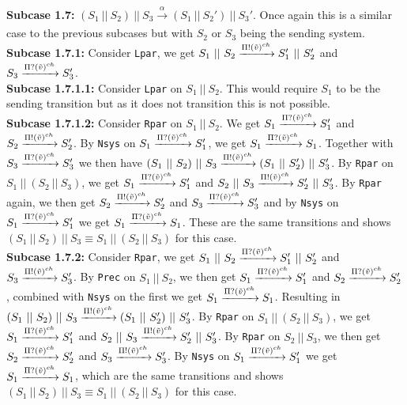 \indent \textbf{Subcase 1.7: }$(S_1 \ || \ S_2)\ ||\ S_3 \xrightarrow[]{\alpha} (S_1 \ || \ S_2')\ ||\ S_3'$. Once again this is a similar case to the previous subcases but with $S_2$ or $S_3$ being the sending system.\\
\indent \indent \textbf{Subcase 1.7.1: } Consider \texttt{Lpar}, we get $S_1 \ || \ S_2 \xrightarrow[]{\Pi ! (\Tilde{v})^{ch}} S_1' \ || \ S_2'$ and $S_3 \xrightarrow[]{\Pi ? (\Tilde{v})^{ch}} S_3'$.\\
\indent \indent \indent \textbf{Subcase 1.7.1.1: } Consider \texttt{Lpar} on $S_1\ ||\ S_2$. This would require $S_1$ to be the sending transition but as it does not transition this is not possible.\\ 
\indent \indent \indent \textbf{Subcase 1.7.1.2: }Consider \texttt{Rpar} on $S_1\ ||\ S_2$. We get $S_1 \xrightarrow[]{\Pi ? (\Tilde{v})^{ch}} S_1'$ and $S_2 \xrightarrow[]{\Pi ! (\Tilde{v})^{ch}} S_2'$. By \texttt{Nsys} on $S_1 \xrightarrow[]{\Pi ? (\Tilde{v})^{ch}} S_1'$, we get $S_1 \xrightarrow[]{\Pi ? (\Tilde{v})^{ch}} S_1$. Together with $S_3 \xrightarrow[]{\Pi ? (\Tilde{v})^{ch}} S_3'$ we then have $(S_1 \ || \ S_2)\ ||\ S_3 \xrightarrow[]{\Pi ! (\Tilde{v})^{ch}} (S_1 \ || \ S_2')\ ||\ S_3'$. By \texttt{Rpar} on $S_1 \ ||\ (S_2 \ || \ S_3)$, we get $S_1 \xrightarrow[]{\Pi ? (\Tilde{v})^{ch}} S_1'$ and $S_2 \ || \ S_3 \xrightarrow[]{\Pi ! (\Tilde{v})^{ch}} S_2' \ || \ S_3'$. By \texttt{Rpar} again, we then get $S_2 \xrightarrow[]{\Pi ! (\Tilde{v})^{ch}} S_2'$ and $S_3 \xrightarrow[]{\Pi ? (\Tilde{v})^{ch}} S_3'$ and by \texttt{Nsys} on $S_1 \xrightarrow[]{\Pi ? (\Tilde{v})^{ch}} S_1'$ we get $S_1 \xrightarrow[]{\Pi ? (\Tilde{v})^{ch}} S_1$. These are the same transitions and shows $(S_1 \ ||\ S_2 )\ || \ S_3 \equiv S_1 \ ||\ (S_2 \ || \ S_3)$ for this case.\\
\indent \indent \textbf{Subcase 1.7.2: }  Consider \texttt{Rpar}, we get $S_1 \ || \ S_2 \xrightarrow[]{\Pi ? (\Tilde{v})^{ch}} S_1' \ || \ S_2'$ and $S_3 \xrightarrow[]{\Pi ! (\Tilde{v})^{ch}} S_3'$. By \texttt{Prec} on $S_1\ ||\ S_2$, we then get $S_1 \xrightarrow[]{\Pi ? (\Tilde{v})^{ch}} S_1'$ and $S_2 \xrightarrow[]{\Pi ? (\Tilde{v})^{ch}} S_2'$, combined with \texttt{Nsys} on the first we get $S_1 \xrightarrow[]{\Pi ? (\Tilde{v})^{ch}} S_1$. Resulting in $(S_1 \ || \ S_2)\ ||\ S_3 \xrightarrow[]{\Pi ! (\Tilde{v})^{ch}} (S_1 \ || \ S_2')\ ||\ S_3'$. By \texttt{Rpar} on $S_1 \ ||\ (S_2 \ || \ S_3)$, we get $S_1 \xrightarrow[]{\Pi ? (\Tilde{v})^{ch}} S_1'$ and $S_2 \ || \ S_3 \xrightarrow[]{\Pi ! (\Tilde{v})^{ch}} S_2' \ || \ S_3'$. By \texttt{Rpar} on $S_2\ ||\ S_3$, we then get $S_2 \xrightarrow[]{\Pi ? (\Tilde{v})^{ch}} S_2'$ and $S_3 \xrightarrow[]{\Pi ! (\Tilde{v})^{ch}} S_3'$. By \texttt{Nsys} on $S_1 \xrightarrow[]{\Pi ? (\Tilde{v})^{ch}} S_1'$ we get $S_1 \xrightarrow[]{\Pi ? (\Tilde{v})^{ch}} S_1$, which are the same transitions and shows $(S_1 \ ||\ S_2 )\ || \ S_3 \equiv S_1 \ ||\ (S_2 \ || \ S_3)$ for this case.\\
